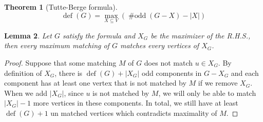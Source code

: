 \documentclass{tufte-handout}
\newcommand{\bra}[1]{\left(#1\right)}
\newtheorem{thm}{Theorem}
\newtheorem{lem}[thm]{Lemma}
\theoremstyle{definition}
\theoremstyle{remark}
\DeclareMathOperator{\odd}{\#odd}
\DeclareMathOperator{\defic}{def}
\begin{document}
\begin{thm}[Tutte-Berge formula]
	$$\defic(G) = \max_{X\subseteq V}\bra{\odd(G-X)- |X|}$$
\end{thm}
\begin{lem}
	Let $G$ satisfy the formula and $X_G$ be the maximizer of the R.H.S., then every maximum matching of $G$ matches every vertices of $X_G$.
\end{lem}
\begin{proof}
	Suppose that some matching $M$ of $G$ does not match $u \in X_G$. By definition of $X_G$, there is $\defic(G) + |X_G|$ odd components in $G-X_G$ and each component has at least one vertex that is not matched by $M$ if we remove $X_G$. When we add $|X_G|$, since $u$ is not matched by $M$, we will only be able to match $|X_G|-1$ more vertices in these components. In total, we still have at least $\defic(G) + 1$ un matched vertices which contradicts maximality of $M$.
\end{proof}
\end{document}
